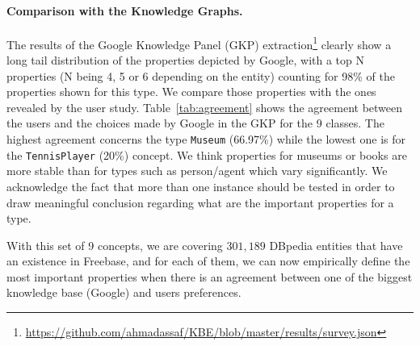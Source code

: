 \documentclass[runningheads,a4paper]{../../Util/LaTEX/llncs}
\begin{document}
\paragraph{\textbf{Comparison with the Knowledge Graphs.}}
\label{sec:comparison}

The results of the Google Knowledge Panel (GKP) extraction\footnote{\url{https://github.com/ahmadassaf/KBE/blob/master/results/survey.json}} clearly show a long tail distribution of the properties depicted by Google, with a top N properties (N being 4, 5 or 6 depending on the entity) counting for 98\% of the properties shown for this type. We compare those properties with the ones revealed by the user study. Table~\ref{tab:agreement} shows the agreement between the users and the choices made by Google in the GKP for the 9 classes. The highest agreement concerns the type \texttt{Museum} (66.97\%) while the lowest one is for the \texttt{TennisPlayer} (20\%) concept. We think properties for museums or books are more stable than for types such as person/agent which vary significantly. We acknowledge the fact that more than one instance should be tested in order to draw meaningful conclusion regarding what are the important properties for a type.
\begin{table}[!htp]
\end{table}\normalsize
\vspace{-0.5cm}
With this set of 9 concepts, we are covering $301,189$ DBpedia entities that have an existence in Freebase, and for each of them, we can now empirically define the most important properties when there is an agreement between one of the biggest knowledge base (Google) and users preferences.
\end{document}
